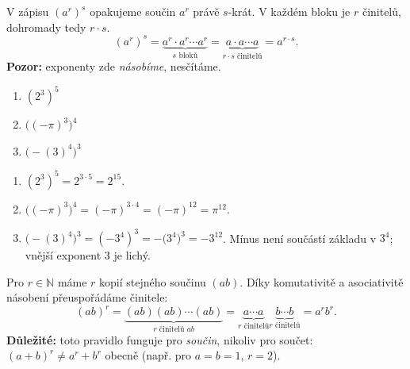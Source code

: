 \documentclass[11pt,a4paper]{article}
\begin{document}
V zápisu $(a^r)^s$ opakujeme součin $a^r$ právě $s$-krát.
V každém bloku je $r$ činitelů, dohromady tedy $r\cdot s$.
\[
(a^r)^s=\underbrace{a^r\cdot a^r\cdots a^r}_{s\text{ bloků}}
=\underbrace{a\cdot a\cdots a}_{r\cdot s\text{ činitelů}}
=a^{r\cdot s}.
\]
\textbf{Pozor:} exponenty zde \emph{násobíme}, nesčítáme.

\begin{prikladReseniBox}[title={Příklad 3},breakable=false]
\begin{enumerate}[label=\alph*)]
\item $(2^3)^5$
\item $\bigl((-\pi)^3\bigr)^4$
\item $\bigl(-(3)^4\bigr)^3$
\end{enumerate}
\tcblower
\begin{enumerate}[label=\alph*),itemsep=2pt]
\item $(2^3)^5=2^{3\cdot5}=\boxed{2^{15}}$.
\item $\bigl((-\pi)^3\bigr)^4=(-\pi)^{3\cdot4}
=(-\pi)^{12}=\boxed{\pi^{12}}$.
\item $\bigl(-(3)^4\bigr)^3=(-3^4)^3=-\bigl(3^4\bigr)^3
=\boxed{-3^{12}}$. Mínus není součástí základu v $3^4$;
vnější exponent $3$ je lichý.
\end{enumerate}
\end{prikladReseniBox}

Pro $r\in\mathbb N$ máme $r$ kopií stejného součinu $(ab)$.
Díky komutativitě a asociativitě násobení přeuspořádáme činitele:
\[
(ab)^r=\underbrace{(ab)(ab)\cdots(ab)}_{r\text{ činitelů }ab}
=\underbrace{a\cdots a}_{r\text{ činitelů}}
 \underbrace{b\cdots b}_{r\text{ činitelů}}=a^r b^r.
\]
\textbf{Důležité:} toto pravidlo funguje pro \emph{součin}, nikoliv
pro součet: $(a+b)^r\ne a^r+b^r$ obecně (např. pro $a=b=1$, $r=2$).
\end{document}
